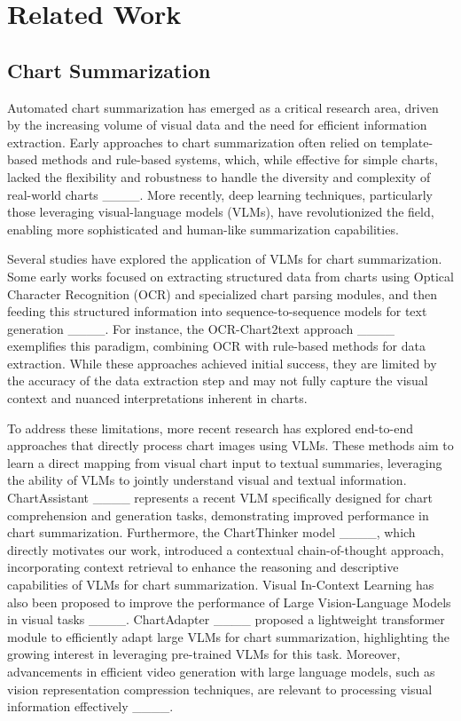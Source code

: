 \section{Related Work}
\subsection{Chart Summarization}

Automated chart summarization has emerged as a critical research area, driven by the increasing volume of visual data and the need for efficient information extraction. Early approaches to chart summarization often relied on template-based methods and rule-based systems, which, while effective for simple charts, lacked the flexibility and robustness to handle the diversity and complexity of real-world charts ____. More recently, deep learning techniques, particularly those leveraging visual-language models (VLMs), have revolutionized the field, enabling more sophisticated and human-like summarization capabilities.

Several studies have explored the application of VLMs for chart summarization. Some early works focused on extracting structured data from charts using Optical Character Recognition (OCR) and specialized chart parsing modules, and then feeding this structured information into sequence-to-sequence models for text generation ____. For instance, the OCR-Chart2text approach ____ exemplifies this paradigm, combining OCR with rule-based methods for data extraction. While these approaches achieved initial success, they are limited by the accuracy of the data extraction step and may not fully capture the visual context and nuanced interpretations inherent in charts.

To address these limitations, more recent research has explored end-to-end approaches that directly process chart images using VLMs. These methods aim to learn a direct mapping from visual chart input to textual summaries, leveraging the ability of VLMs to jointly understand visual and textual information. ChartAssistant ____ represents a recent VLM specifically designed for chart comprehension and generation tasks, demonstrating improved performance in chart summarization.  Furthermore, the ChartThinker model ____, which directly motivates our work, introduced a contextual chain-of-thought approach, incorporating context retrieval to enhance the reasoning and descriptive capabilities of VLMs for chart summarization.  Visual In-Context Learning has also been proposed to improve the performance of Large Vision-Language Models in visual tasks ____. ChartAdapter ____ proposed a lightweight transformer module to efficiently adapt large VLMs for chart summarization, highlighting the growing interest in leveraging pre-trained VLMs for this task.  Moreover, advancements in efficient video generation with large language models, such as vision representation compression techniques, are relevant to processing visual information effectively ____.

